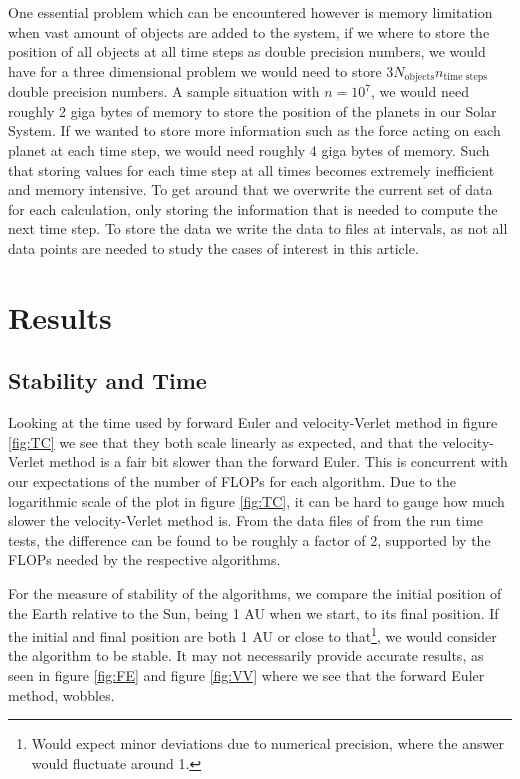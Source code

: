 \documentclass[%
reprint,
nofootinbib,
amsmath,amssymb,
aps,
]{revtex4-1}
\begin{document}
One essential problem which can be encountered however is memory limitation when vast amount of objects are added to the system, if we where to store the position of all objects at all time steps as double precision numbers, we would have for a three dimensional problem we would need to store $3N_{\text{objects}}n_{\text{time steps}}$ double precision numbers. A sample situation with $n = 10^7$, we would need roughly 2 giga bytes of memory to store the position of the planets in our Solar System. If we wanted to store more information such as the force acting on each planet at each time step, we would need roughly 4 giga bytes of memory. Such that storing values for each time step at all times becomes extremely inefficient and memory intensive. To get around that we overwrite the current set of data for each calculation, only storing the information that is needed to compute the next time step. To store the data we write the data to files at intervals, as not all data points are needed to study the cases of interest in this article. 

\section{Results}
\subsection{Stability and Time}%
Looking at the time used by forward Euler and velocity-Verlet method in figure \ref{fig:TC} we see that they both scale linearly as expected, and that the velocity-Verlet method is a fair bit slower than the forward Euler. 
This is concurrent with our expectations of the number of FLOPs for each algorithm.
Due to the logarithmic scale of the plot in figure \ref{fig:TC}, it can be hard to gauge how much slower the velocity-Verlet method is. From the data files of from the run time tests, the difference can be found to be roughly a factor of 2, supported by the FLOPs needed by the respective algorithms.

For the measure of stability of the algorithms, we compare the initial position of the Earth relative to the Sun, being 1 AU when we start, to its final position. If the initial and final position are both 1 AU or close to that\footnote{Would expect minor deviations due to numerical precision, where the answer would fluctuate around 1.}, we would consider the algorithm to be stable. 
It may not necessarily provide accurate results, as seen in figure \ref{fig:FE} and figure \ref{fig:VV} where we see that the forward Euler method, wobbles. 
\end{document}
